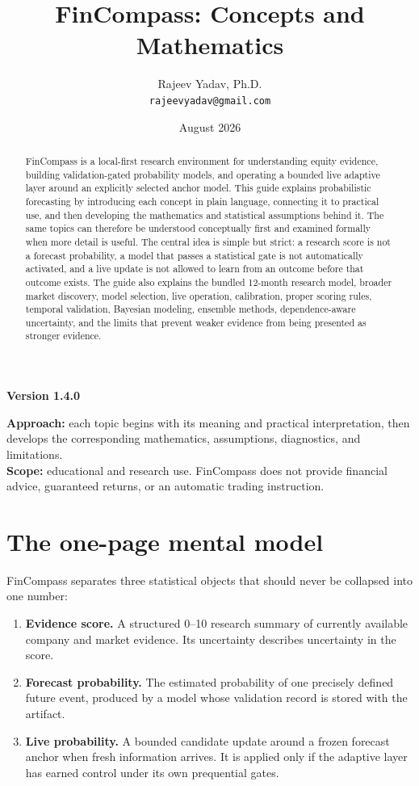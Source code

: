 \documentclass[11pt]{article}
\title{\textbf{FinCompass: Concepts and Mathematics}}
\author{Rajeev Yadav, Ph.D.\\\texttt{rajeevyadav@gmail.com}}
\date{August 2026}
\begin{document}
\maketitle
\begin{center}
\textbf{Version 1.4.0}
\end{center}

\begin{abstract}
FinCompass is a local-first research environment for understanding equity evidence, building validation-gated probability models, and operating a bounded live adaptive layer around an explicitly selected anchor model. This guide explains probabilistic forecasting by introducing each concept in plain language, connecting it to practical use, and then developing the mathematics and statistical assumptions behind it. The same topics can therefore be understood conceptually first and examined formally when more detail is useful. The central idea is simple but strict: a research score is not a forecast probability, a model that passes a statistical gate is not automatically activated, and a live update is not allowed to learn from an outcome before that outcome exists. The guide also explains the bundled 12-month research model, broader market discovery, model selection, live operation, calibration, proper scoring rules, temporal validation, Bayesian modeling, ensemble methods, dependence-aware uncertainty, and the limits that prevent weaker evidence from being presented as stronger evidence.
\end{abstract}

\noindent\textbf{Approach:} each topic begins with its meaning and practical interpretation, then develops the corresponding mathematics, assumptions, diagnostics, and limitations.\\
\textbf{Scope:} educational and research use. FinCompass does not provide financial advice, guaranteed returns, or an automatic trading instruction.

\tableofcontents
\newpage

\section{The one-page mental model}

FinCompass separates three statistical objects that should never be collapsed into one number:

\begin{enumerate}
\item \textbf{Evidence score.} A structured 0--10 research summary of currently available company and market evidence. Its uncertainty describes uncertainty in the score.
\item \textbf{Forecast probability.} The estimated probability of one precisely defined future event, produced by a model whose validation record is stored with the artifact.
\item \textbf{Live probability.} A bounded candidate update around a frozen forecast anchor when fresh information arrives. It is applied only if the adaptive layer has earned control under its own prequential gates.
\end{enumerate}
\end{document}
